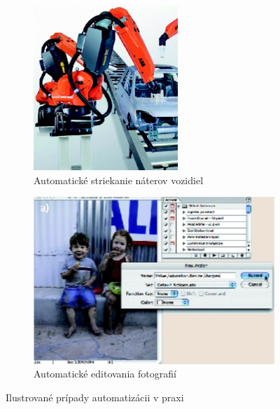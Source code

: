 \documentclass[twoside,slovak, a4paper]{article}
\begin{document}
\begin{figure}
    \begin{subfigure}[t]{0.5\textwidth} %
        \centering
          \includegraphics[width=0.6\textwidth]{pics/car_painting_automation.png}
          \caption{Automatické striekanie náterov vozidiel}
          \label{fig:2}
    \end{subfigure}
    \begin{subfigure}[t]{0.491\textwidth}
        \centering
        \includegraphics[width=1\linewidth]{pics/photo_edit_automation.png}
        \caption{Automatické editovania fotografií}
        \label{fig:3}
    \end{subfigure}
    \caption{Ilustrované prípady automatizácii v praxi\cite{Nof2009}}
\end{figure}
\end{document}
